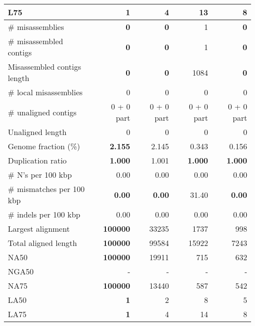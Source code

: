 \documentclass[12pt,a4paper]{article}
\begin{document}
\begin{table}[ht]
\begin{center}
\begin{tabular}{|l*{4}{|r}|}
L75 & {\bf 1} & 4 & 13 & 8 \\ \hline
\# misassemblies & {\bf 0} & {\bf 0} & 1 & {\bf 0} \\ \hline
\# misassembled contigs & {\bf 0} & {\bf 0} & 1 & {\bf 0} \\ \hline
Misassembled contigs length & {\bf 0} & {\bf 0} & 1084 & {\bf 0} \\ \hline
\# local misassemblies & 0 & 0 & 0 & 0 \\ \hline
\# unaligned contigs & 0 + 0 part & 0 + 0 part & 0 + 0 part & 0 + 0 part \\ \hline
Unaligned length & 0 & 0 & 0 & 0 \\ \hline
Genome fraction (\%) & {\bf 2.155} & 2.145 & 0.343 & 0.156 \\ \hline
Duplication ratio & {\bf 1.000} & 1.001 & {\bf 1.000} & {\bf 1.000} \\ \hline
\# N's per 100 kbp & 0.00 & 0.00 & 0.00 & 0.00 \\ \hline
\# mismatches per 100 kbp & {\bf 0.00} & {\bf 0.00} & 31.40 & {\bf 0.00} \\ \hline
\# indels per 100 kbp & 0.00 & 0.00 & 0.00 & 0.00 \\ \hline
Largest alignment & {\bf 100000} & 33235 & 1737 & 998 \\ \hline
Total aligned length & {\bf 100000} & 99584 & 15922 & 7243 \\ \hline
NA50 & {\bf 100000} & 19911 & 715 & 632 \\ \hline
NGA50 & - & - & - & - \\ \hline
NA75 & {\bf 100000} & 13440 & 587 & 542 \\ \hline
LA50 & {\bf 1} & 2 & 8 & 5 \\ \hline
LA75 & {\bf 1} & 4 & 14 & 8 \\ \hline
\end{tabular}
\end{center}
\end{table}
\end{document}
